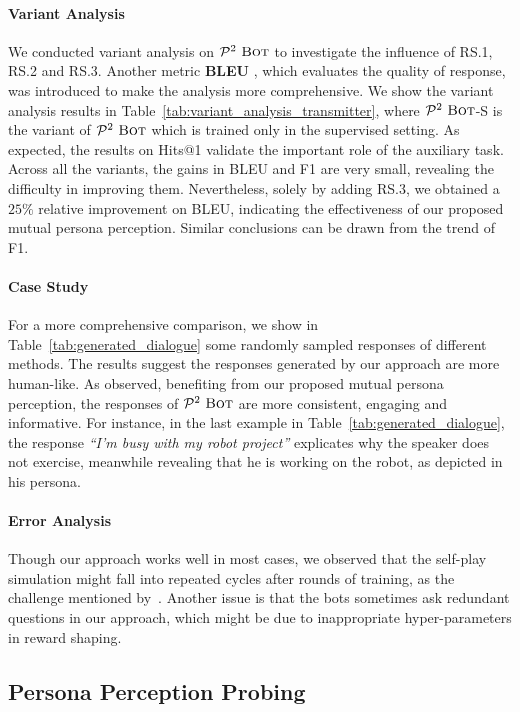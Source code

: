 \documentclass[11pt,a4paper]{article}
\begin{document}
\paragraph{Variant Analysis} We conducted variant analysis on $\mathcal{P}^2~\textsc{Bot}$ to investigate the influence of RS.1, RS.2 and RS.3. Another metric \textbf{BLEU} \cite{papineni-etal-2002-bleu}, which evaluates the quality of response, was introduced to make the analysis more comprehensive. We show the variant analysis results in Table~\ref{tab:variant_analysis_transmitter}, where $\mathcal{P}^2~\textsc{Bot}$-S is the variant of $\mathcal{P}^2~\textsc{Bot}$ which is trained only in the supervised setting. As expected, the results on Hits@1 validate the important role of the auxiliary task. Across all the variants, the gains in BLEU and F1 are very small, revealing the difficulty in improving them. Nevertheless, solely by adding RS.3, we obtained a $25\%$ relative improvement on BLEU, indicating the effectiveness of our proposed mutual persona perception. Similar conclusions can be drawn from the trend of F1.

\paragraph{Case Study} For a more comprehensive comparison, we show in Table~\ref{tab:generated_dialogue} some randomly sampled responses of different methods. The results suggest the responses generated by our approach are more human-like. As observed, benefiting from our proposed mutual persona perception, the responses of $\mathcal{P}^2~\textsc{Bot}$ are more consistent, engaging and informative. For instance, in the last example in Table~\ref{tab:generated_dialogue}, the response \textit{``I'm busy with my robot project''} explicates why the speaker does not exercise, meanwhile revealing that he is working on the robot, as depicted in his persona.

\paragraph{Error Analysis} Though our approach works well in most cases, we observed that the self-play simulation might fall into repeated cycles after rounds of training, as the challenge mentioned by~\citet{li2016deep}. Another issue is that the bots sometimes ask redundant questions in our approach, which might be due to inappropriate hyper-parameters in reward shaping.


\subsection{Persona Perception Probing}\label{sec:receiver discussion}
\end{document}
